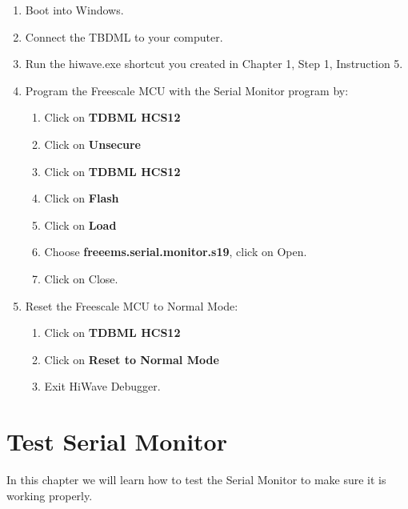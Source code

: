 \documentclass[12pt,notitlepage,onecolumn,oneside,openany]{memoir}
\begin{document}
\begin{enumerate}

\item \textsf{Boot into Windows.}

\item \textsf{Connect the TBDML to your computer.}

\item \textsf{Run the hiwave.exe shortcut you created in Chapter 1, Step 1, Instruction 5.}

\item \textsf{Program the Freescale MCU with the Serial Monitor program by:} 
      \begin{enumerate}
      \item \textsf{Click on  \textbf{TDBML HCS12}}
      \item \textsf{Click on  \textbf{Unsecure}}
      \item \textsf{Click on  \textbf{TDBML HCS12}}
      \item \textsf{Click on  \textbf{Flash}}
      \item \textsf{Click on  \textbf{Load}}
      \item \textsf{Choose \textbf{freeems.serial.monitor.s19}, click on Open.} 
      \item \textsf{Click on Close.}
      \end{enumerate}

\item \textsf{Reset the Freescale MCU to Normal Mode:}
      \begin{enumerate}
      \item \textsf{Click on  \textbf{TDBML HCS12}}
      \item \textsf{Click on \textbf{Reset to Normal Mode}}
      \item \textsf{Exit HiWave Debugger.}
      \end{enumerate}

\end{enumerate}

\chapter{\textsf{Test Serial Monitor}}

\textsf{In this chapter we will learn how to test the Serial Monitor to make sure it is working properly.} \newline
\end{document}
